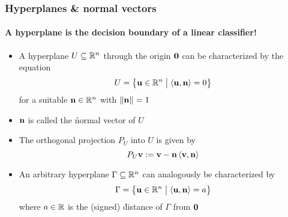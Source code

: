 \begin{frame}
  \frametitle{Hyperplanes \& normal vectors}
  \framesubtitle{A hyperplane is the decision boundary of a linear classifier!}

  \begin{itemize}
  \item A hyperplane $U\subseteq \mathbb{R}^n$ through the origin $\vnull$ can be
    characterized by the equation
    \[ U = \bigsetdef{\vu\in\setR^n}{\sprod{\vu}{\vn} = 0} \]
    for a suitable $\vn\in\setR^n$ with $\norm{\vn} = 1$
  \item $\vn$ is called the \h{normal vector} of $U$
  \item<2-> The orthogonal projection $P_U$ into $U$ is given by
    \[ P_U \vv \coloneq \vv - \vn \sprod{\vv}{\vn} \]
  \item<3-> An arbitrary hyperplane $\Gamma\subseteq \mathbb{R}^n$ can analogously
    be characterized by
    \[ \Gamma = \bigsetdef{\vu\in\setR^n}{\sprod{\vu}{\vn} = a} \]
    where $a\in \mathbb{R}$ is the (signed) \h{distance} of $\Gamma$ from $\vnull$
  \end{itemize}
\end{frame}

